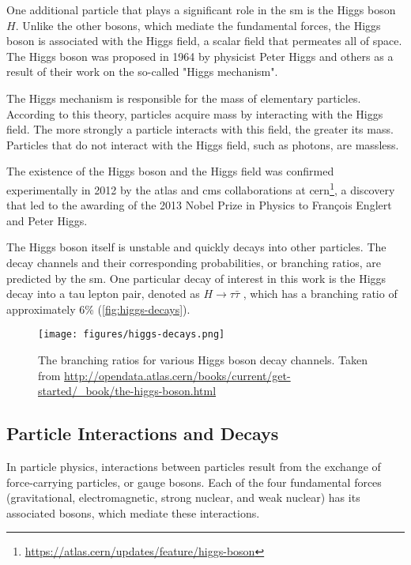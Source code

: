 One additional particle that plays a significant role in the \gls{sm} is the Higgs boson $H$. Unlike the other bosons,
which mediate the fundamental forces, the Higgs boson is associated with the Higgs field, a scalar field that permeates
all of space. The Higgs boson was proposed in 1964 by physicist Peter Higgs and others as a result of their work on the
so-called "Higgs mechanism".

The Higgs mechanism is responsible for the mass of elementary particles. According to this theory, particles acquire
mass by interacting with the Higgs field. The more strongly a particle interacts with this field, the greater its mass.
Particles that do not interact with the Higgs field, such as photons, are massless.

The existence of the Higgs boson and the Higgs field was confirmed experimentally in 2012 by the \gls{atlas} and \gls{cms}
collaborations at \gls{cern}\footnote{\url{https://atlas.cern/updates/feature/higgs-boson}}, a discovery that led to the awarding of the 2013 Nobel Prize in Physics to François Englert and
Peter Higgs.

The Higgs boson itself is unstable and quickly decays into other particles. The decay channels and their corresponding
probabilities, or branching ratios, are predicted by the \gls{sm}. One particular decay of interest in
this work is the Higgs decay into a tau lepton pair, denoted as $H \rightarrow \tau\bar{\tau}$ , which has a branching
ratio of approximately 6\% (\autoref{fig:higgs-decays}).

\begin{figure}[htb]
    \centering
    \texttt{[image: figures/higgs-decays.png]}
    \caption{The branching ratios for various Higgs boson decay channels. Taken from
        \url{http://opendata.atlas.cern/books/current/get-started/_book/the-higgs-boson.html}}
    \label{fig:higgs-decays}
\end{figure}



\subsection{Particle Interactions and Decays}

In particle physics, interactions between particles result from the exchange of force-carrying particles, or gauge
bosons. Each of the four fundamental forces (gravitational, electromagnetic, strong nuclear, and weak nuclear) has its
associated bosons, which mediate these interactions.

